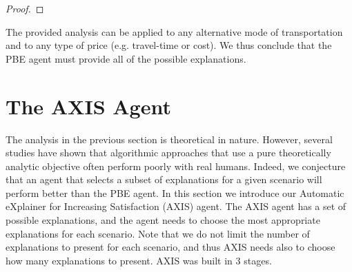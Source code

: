 \documentclass[letterpaper]{article} %
\begin{document}
\begin{proof}

\end{proof}

The provided analysis can be applied to any alternative mode of transportation and to any type of price (e.g. travel-time or cost). We thus conclude that the PBE agent must provide all of the possible explanations.










%
%

\section{The AXIS Agent}
\label{sec:AXIS}
The analysis in the previous section is theoretical in nature. However, several studies have shown that algorithmic approaches that use a pure theoretically analytic objective often perform poorly with real humans. Indeed, we conjecture that an agent that selects a subset of explanations for a given scenario will perform better than the PBE agent. 
In this section we introduce our Automatic eXplainer for Increasing Satisfaction (AXIS) agent. 
The AXIS agent has a set of possible explanations, and the agent needs to choose the most appropriate explanations for each scenario. Note that we do not limit the number of explanations to present for each scenario, and thus AXIS needs also to choose how many explanations to present. AXIS was built in $3$ stages.
\end{document}

